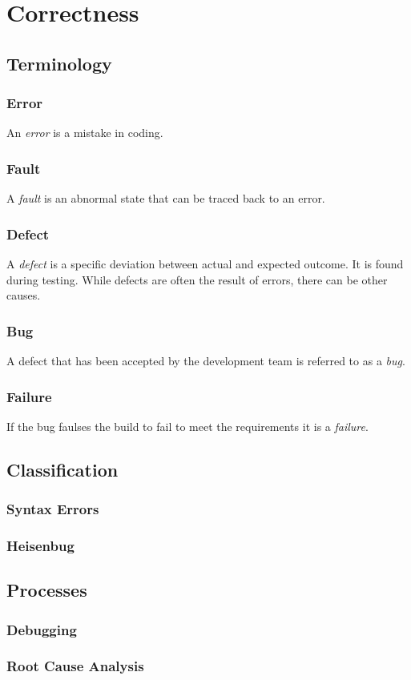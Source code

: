 \section{Correctness}
\label{a:topic/correctness}

\subsection{Terminology}

\subsubsection{Error}

An \textsl{error} is a mistake in coding.

\subsubsection{Fault}

A \textsl{fault} is an abnormal state that can be traced back to an error.

\subsubsection{Defect}

A \textsl{defect} is a specific deviation between actual and expected outcome. It is found during testing. While defects are often the result of errors, there can be other causes.

\subsubsection{Bug}

A defect that has been accepted by the development team is referred to as a \textsl{bug}.

\subsubsection{Failure}

If the bug faulses the build to fail to meet the requirements it is a \textsl{failure}.

\subsection{Classification}

\subsubsection{Syntax Errors}

\subsubsection{Heisenbug}

\subsection{Processes}

\subsubsection{Debugging}
\subsubsection{Root Cause Analysis}

